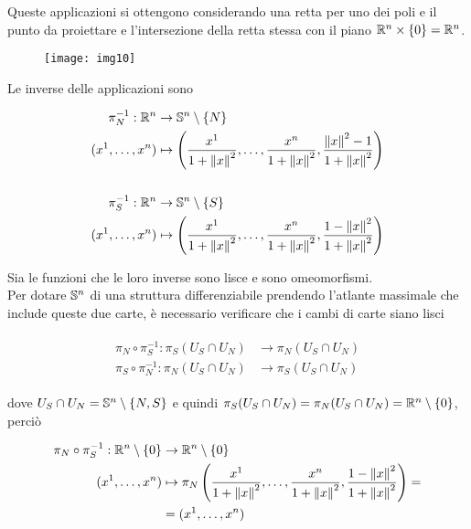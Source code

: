 Queste applicazioni si ottengono considerando una retta per uno dei poli e il punto da proiettare e l'intersezione della retta stessa con il piano $ \R^{n} \times \{0\} = \R^{n} $.

\begin{figure}[H]
	\centering
	\texttt{[image: img10]}
\end{figure}

Le inverse delle applicazioni sono

\begin{align}
	\begin{split}
		\pi_{N}^{-1} : \R^{n} &\to \S^{n} \setminus \{N\}\\
		(x^{1},\dots,x^{n}) &\mapsto \left( \dfrac{x^{1}}{1+\norm{x}^{2}},\dots,\dfrac{x^{n}}{1+\norm{x}^{2}},\dfrac{\norm{x}^{2}-1}{1+\norm{x}^{2}} \right)\\\\
		\pi_{S}^{-1} : \R^{n} &\to \S^{n} \setminus \{S\}\\
		(x^{1},\dots,x^{n}) &\mapsto \left( \dfrac{x^{1}}{1+\norm{x}^{2}},\dots,\dfrac{x^{n}}{1+\norm{x}^{2}},\dfrac{1-\norm{x}^{2}}{1+\norm{x}^{2}} \right)
	\end{split}
\end{align}

Sia le funzioni che le loro inverse sono lisce e sono omeomorfismi.\\
Per dotare $ \S^{n} $ di una struttura differenziabile prendendo l'atlante massimale che include queste due carte, è necessario verificare che i cambi di carte siano lisci

\begin{align}
	\begin{split}
		\pi_{N} \circ \pi_{S}^{-1} : \pi_{S}(U_{S} \cap U_{N}) &\to \pi_{N}(U_{S} \cap U_{N})\\
		\pi_{S} \circ \pi_{N}^{-1} : \pi_{N}(U_{S} \cap U_{N}) &\to \pi_{S}(U_{S} \cap U_{N})
	\end{split}
\end{align}

dove $ U_{S} \cap U_{N} = \S^{n} \setminus \{N,S\} $ e quindi $ \pi_{S}(U_{S} \cap U_{N}) = \pi_{N}(U_{S} \cap U_{N}) = \R^{n} \setminus \{0\} $, perciò

\begin{align}
	\begin{split}
		\pi_{N} \circ \pi_{S}^{-1} : \R^{n} \setminus \{0\} &\to \R^{n} \setminus \{0\}\\
		(x^{1},\dots,x^{n}) &\mapsto \pi_{N}\left( \dfrac{x^{1}}{1+\norm{x}^{2}},\dots,\dfrac{x^{n}}{1+\norm{x}^{2}},\dfrac{1-\norm{x}^{2}}{1+\norm{x}^{2}} \right) =\\
		&= (x^{1},\dots,x^{n})
	\end{split}
\end{align}

